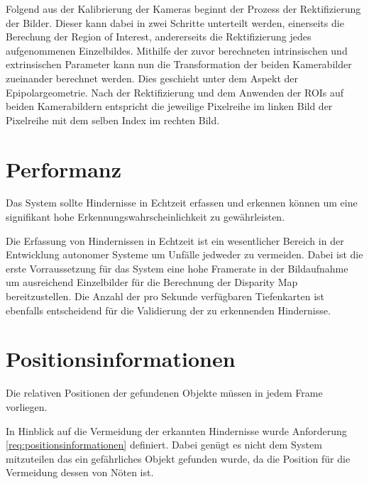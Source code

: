 \noindent
Folgend aus der Kalibrierung der Kameras beginnt der Prozess der Rektifizierung der Bilder. Dieser kann dabei in zwei Schritte unterteilt werden, einerseits die Berechung der Region of Interest, andererseits die Rektifizierung jedes aufgenommenen Einzelbildes. Mithilfe der zuvor berechneten intrinsischen und extrinsischen Parameter kann nun die Transformation der beiden Kamerabilder zueinander berechnet werden. Dies geschieht unter dem Aspekt der Epipolargeometrie. Nach der Rektifizierung und dem Anwenden der ROIs auf beiden Kamerabildern entspricht die jeweilige Pixelreihe im linken Bild der Pixelreihe mit dem selben Index im rechten Bild.\\

\section{Performanz}
\label{sec:performanz}

	\begin{anforderung}
	\label{req:performanz}
		Das System sollte Hindernisse in Echtzeit erfassen und erkennen können um eine signifikant hohe Erkennungswahrscheinlichkeit zu gewährleisten.
	\end{anforderung}

\noindent
Die Erfassung von Hindernissen in Echtzeit ist ein wesentlicher Bereich in der Entwicklung autonomer Systeme um Unfälle jedweder zu vermeiden. Dabei ist die erste Vorraussetzung für das System eine hohe Framerate in der Bildaufnahme um ausreichend Einzelbilder für die Berechnung der Disparity Map bereitzustellen. Die Anzahl der pro Sekunde verfügbaren Tiefenkarten ist ebenfalls entscheidend für die Validierung der zu erkennenden Hindernisse.
	

\section{Positionsinformationen}
\label{sec:positionsinformationen}

	\begin{anforderung}
	\label{req:positionsinformationen}
		Die relativen Positionen der gefundenen Objekte müssen in jedem Frame vorliegen.
	\end{anforderung}
	
In Hinblick auf die Vermeidung der erkannten Hindernisse wurde Anforderung \ref{req:positionsinformationen} definiert. Dabei genügt es nicht dem System mitzuteilen das ein gefährliches Objekt gefunden wurde, da die Position für die Vermeidung dessen von Nöten ist. 

